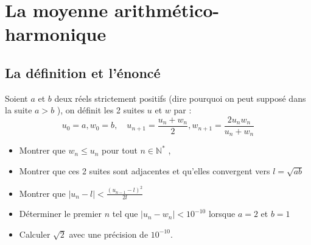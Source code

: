\documentclass[a4paper,11pt]{book}
\newcommand{\N}{{\mathbb{N}}}
\begin{document}
\section{La moyenne arithm\'etico-harmonique}
\subsection{La d\'efinition et l'\'enonc\'e}
Soient $a$ et $b$ deux r\'eels strictement positifs (dire pourquoi on peut 
suppos\'e dans la suite $a>b$ ), on d\'efinit les 2 suites $u$ et $w$ par :
\begin{equation} \label{eq:ahm}
 u_0=a, w_0=b, \quad u_{n+1}=\frac{u_n+w_n}{2}, w_{n+1}=\frac{2u_nw_n}{u_n+w_n} 
\end{equation}
\begin{itemize}
\item Montrer que $w_n\leq u_n$ pour tout $n \in \N^*$ ,
\item Montrer que ces 2 suites sont adjacentes et qu'elles convergent vers 
$l=\sqrt{ab}$
\item Montrer que $\displaystyle |u_n-l|<\frac{(u_{n-1}-l)^2}{2l}$
\item D\'eterminer le premier $n$ tel que $|u_n-w_n|<10^{-10}$ lorsque $a=2$
et $b=1$
\item Calculer $\sqrt 2$  avec une pr\'ecision de $10^{-10}$.
\end{itemize}
\end{document}
